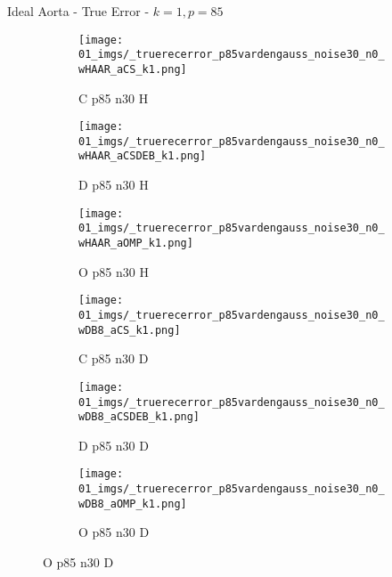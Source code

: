 \begin{frame}{Ideal Aorta - True Error - $k=1,p=85$}{}
\begin{figure}
\begin{subfigure}{0.13\textwidth}
\texttt{[image: 01\_imgs/\_truerecerror\_p85vardengauss\_noise30\_n0\_wHAAR\_aCS\_k1.png]}
\caption*{\tiny C p85 n30 H}
\end{subfigure}
\begin{subfigure}{0.13\textwidth}
\texttt{[image: 01\_imgs/\_truerecerror\_p85vardengauss\_noise30\_n0\_wHAAR\_aCSDEB\_k1.png]}
\caption*{\tiny D p85 n30 H}
\end{subfigure}
\begin{subfigure}{0.13\textwidth}
\texttt{[image: 01\_imgs/\_truerecerror\_p85vardengauss\_noise30\_n0\_wHAAR\_aOMP\_k1.png]}
\caption*{\tiny O p85 n30 H}
\end{subfigure}
\begin{subfigure}{0.13\textwidth}
\texttt{[image: 01\_imgs/\_truerecerror\_p85vardengauss\_noise30\_n0\_wDB8\_aCS\_k1.png]}
\caption*{\tiny C p85 n30 D}
\end{subfigure}
\begin{subfigure}{0.13\textwidth}
\texttt{[image: 01\_imgs/\_truerecerror\_p85vardengauss\_noise30\_n0\_wDB8\_aCSDEB\_k1.png]}
\caption*{\tiny D p85 n30 D}
\end{subfigure}
\begin{subfigure}{0.13\textwidth}
\texttt{[image: 01\_imgs/\_truerecerror\_p85vardengauss\_noise30\_n0\_wDB8\_aOMP\_k1.png]}
\caption*{\tiny O p85 n30 D}
\end{subfigure}
\end{figure}
\end{frame}

